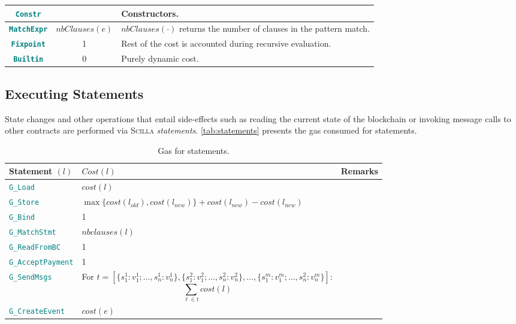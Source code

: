 \documentclass[9pt]{article}
\begin{document}
\begin{table}[!hbt]
\begin{tabular}{|c|c|p{8.5cm}|}
			\textbf{\texttt{\textcolor{teal}{Constr}}}  &  & Constructors. \\ \hline
			\textbf{\texttt{\textcolor{teal}{MatchExpr}}}  & $nbClauses(e)$
		&$nbClauses(\cdot)$ returns the number of clauses in the pattern match.
		 \\ \hline
	   \textbf{\texttt{\textcolor{teal}{Fixpoint}}}  & 1  & Rest of the cost is
		accounted during recursive evaluation. \\ \hline
		\textbf{\texttt{\textcolor{teal}{Builtin}}}  & 0 & Purely dynamic cost. \\ \hline
	\end{tabular}
	\end{table}
 

\subsection{Executing Statements}

State changes and other operations that entail side-effects such as reading the
current state of the blockchain or invoking message calls to other contracts
are performed via \textsc{Scilla} \emph{statements}. \autoref{tab:statements}
presents the gas consumed for statements.

\begin{table}[!hbt]
	\caption{Gas for statements. \label{tab:statements} }
\centering
	\begin{tabular}{|l|p{8cm}|p{3cm}|}
	\hline
		\textbf{Statement $(l)$} & \textbf{$Cost(l)$} & \textbf{Remarks} \\ \hline
		\texttt{\textcolor{teal}{G\_Load}}  & $cost(l)$  & \\ \hline
		\texttt{\textcolor{teal}{G\_Store}}  & $\max\{cost(l_{old}),
		cost(l_{new})\} + cost(l_{new}) -
		cost(l_{new})$  & \\ \hline
		\texttt{\textcolor{teal}{G\_Bind}}  & 1 & \\ \hline
		\texttt{\textcolor{teal}{G\_MatchStmt}}  & $nbclauses(l)$  & \\ \hline
		\texttt{\textcolor{teal}{G\_ReadFromBC}}  & 1  & \\ \hline
		\texttt{\textcolor{teal}{G\_AcceptPayment}}  & 1  & \\ \hline
		\texttt{\textcolor{teal}{G\_SendMsgs}}  & For $t = [\{s_{1}^{1} :
		v_{1}^{1}; \ldots, s_n^1 : v_n^1\}, \{s_1^2 : v_1^2; \ldots, s_n^2 :
		v_n^2\}, \ldots, \{s_1^m : v_1^m; \ldots, s_n^2 : v_n^m\}] $: $$
		\sum_{\ell \in t} cost(l) $$ & \\ \hline
		\texttt{\textcolor{teal}{G\_CreateEvent}}  & $cost(e)$ & \\ \hline
	\end{tabular}
\end{table}
\end{document}
